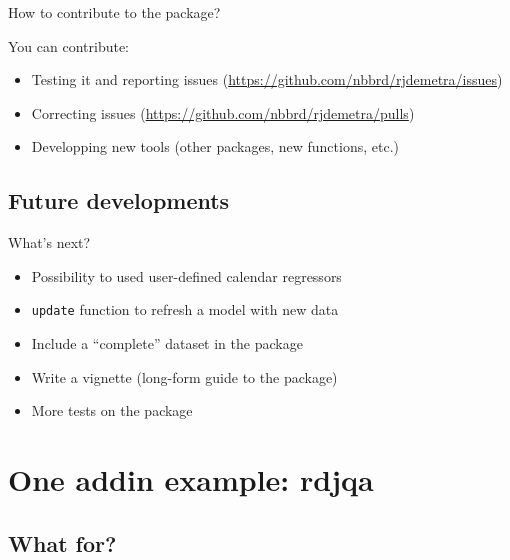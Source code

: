 \documentclass[10pt,xcolor=table,color={dvipsnames,usenames},ignorenonframetext,usepdftitle=false,french]{beamer}
\begin{document}
\begin{frame}{How to contribute to the package?}

You can contribute:

\begin{itemize}
\item
  Testing it and reporting issues
  (\url{https://github.com/nbbrd/rjdemetra/issues})
\item
  Correcting issues (\url{https://github.com/nbbrd/rjdemetra/pulls})
\item
  Developping new tools (other packages, new functions, etc.)
\end{itemize}

\end{frame}

\subsection{Future developments}\label{future-developments}

\begin{frame}[fragile]{What's next? \bcpanchant}

\begin{itemize}
\item
  Possibility to used user-defined calendar regressors
\item
  \texttt{update} function to refresh a model with new data
\item
  Include a ``complete'' dataset in the package
\item
  Write a vignette (long-form guide to the package)
\item
  More tests on the package
\end{itemize}

\end{frame}

\section{One addin example: rdjqa}\label{one-addin-example-rdjqa}

\subsection{What for?}\label{what-for}
\end{document}
